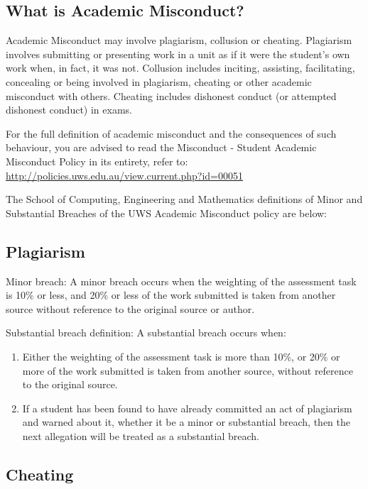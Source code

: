 \documentclass[a4paper,oneside]{book}
\begin{document}
\subsection*{What is Academic Misconduct?}

Academic Misconduct may involve plagiarism, collusion or cheating.
Plagiarism involves submitting or presenting work in a unit as if it
were the student's own work when, in fact, it was not. Collusion
includes inciting, assisting, facilitating, concealing or being
involved in plagiarism, cheating or other academic misconduct with
others.  Cheating includes dishonest conduct (or attempted dishonest
conduct) in exams.

For the full definition of academic misconduct and the consequences of
such behaviour, you are advised to read the Misconduct - Student
Academic Misconduct Policy in its entirety, refer to:
\url{http://policies.uws.edu.au/view.current.php?id=00051} 

The School of Computing, Engineering and Mathematics definitions of Minor and
Substantial Breaches of the UWS Academic Misconduct policy are below:

\subsection*{Plagiarism}

Minor breach: A minor breach occurs when the weighting of the
assessment task is 10\% or less, and 20\% or less of the work
submitted is taken from another source without reference to the
original source or author.

Substantial breach definition:  A substantial breach occurs when:
\begin{enumerate}
\item Either the weighting of the assessment task is more than 10\%,
  or 20\% or more of the work submitted is taken from another source,
  without reference to the original source.
\item If a student has been found to have already committed an act of
  plagiarism and warned about it, whether it be a minor or substantial
  breach, then the next allegation will be treated as a substantial
  breach.
\end{enumerate}

\subsection*{Cheating}
\end{document}
